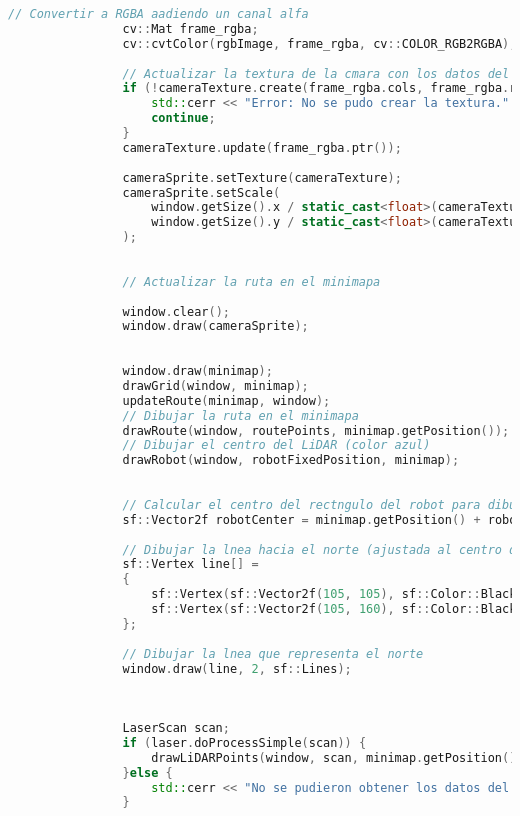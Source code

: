 \begin{lstlisting}[language={C++}, caption={Primer ajuste de c\'odigo}, label={Script}]
                // Convertir a RGBA aadiendo un canal alfa
                cv::Mat frame_rgba;
                cv::cvtColor(rgbImage, frame_rgba, cv::COLOR_RGB2RGBA);
        
                // Actualizar la textura de la cmara con los datos del frame
                if (!cameraTexture.create(frame_rgba.cols, frame_rgba.rows)) {
                    std::cerr << "Error: No se pudo crear la textura." << std::endl;
                    continue;
                }
                cameraTexture.update(frame_rgba.ptr());
        
                cameraSprite.setTexture(cameraTexture);
                cameraSprite.setScale(
                    window.getSize().x / static_cast<float>(cameraTexture.getSize().x),
                    window.getSize().y / static_cast<float>(cameraTexture.getSize().y)
                );
        
        
                // Actualizar la ruta en el minimapa
                
                window.clear();
                window.draw(cameraSprite);
        
                
                window.draw(minimap);
                drawGrid(window, minimap);
                updateRoute(minimap, window);
                // Dibujar la ruta en el minimapa
                drawRoute(window, routePoints, minimap.getPosition());
                // Dibujar el centro del LiDAR (color azul)
                drawRobot(window, robotFixedPosition, minimap);
        
        
                // Calcular el centro del rectngulo del robot para dibujar la lnea que indica el norte
                sf::Vector2f robotCenter = minimap.getPosition() + robotFixedPosition;
        
                // Dibujar la lnea hacia el norte (ajustada al centro del rectngulo)
                sf::Vertex line[] =
                {
                    sf::Vertex(sf::Vector2f(105, 105), sf::Color::Black), // Posicin inicial de la lnea
                    sf::Vertex(sf::Vector2f(105, 160), sf::Color::Black)   // Posicin final hacia arriba
                };
        
                // Dibujar la lnea que representa el norte
                window.draw(line, 2, sf::Lines);
        
        
        
                LaserScan scan;
                if (laser.doProcessSimple(scan)) {
                    drawLiDARPoints(window, scan, minimap.getPosition(), 25.0f, max_range);
                }else {
                    std::cerr << "No se pudieron obtener los datos del LiDAR." << std::endl;
                }
        

\end{lstlisting}
